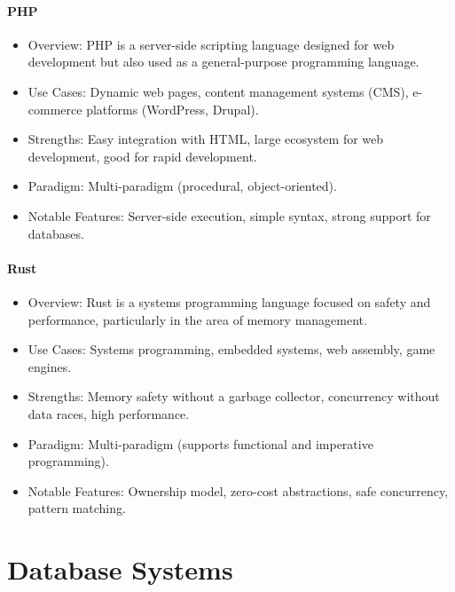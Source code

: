 \documentclass[openany]{book} %
\begin{document}
\subsection{PHP}
\begin{itemize}
\item Overview: PHP is a server-side scripting language designed for web development but also used as a general-purpose programming language.
\item Use Cases: Dynamic web pages, content management systems (CMS), e-commerce platforms (WordPress, Drupal).
\item Strengths: Easy integration with HTML, large ecosystem for web development, good for rapid development.
\item Paradigm: Multi-paradigm (procedural, object-oriented).
\item Notable Features: Server-side execution, simple syntax, strong support for databases.
\end{itemize}

\subsection{Rust}
\begin{itemize}
\item Overview: Rust is a systems programming language focused on safety and performance, particularly in the area of memory management.
\item Use Cases: Systems programming, embedded systems, web assembly, game engines.
\item Strengths: Memory safety without a garbage collector, concurrency without data races, high performance.
\item Paradigm: Multi-paradigm (supports functional and imperative programming).
\item Notable Features: Ownership model, zero-cost abstractions, safe concurrency, pattern matching.
\end{itemize}


\part{Database Systems}

\end{document}
